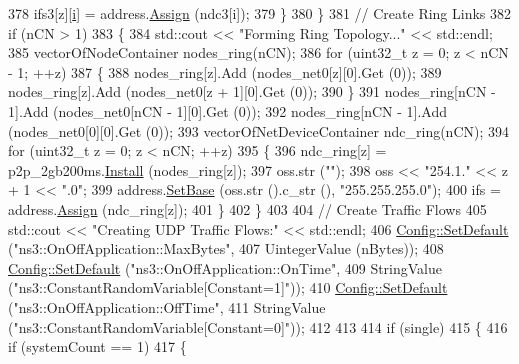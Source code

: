 \begin{DoxyCode}
378           ifs3[z][\hyperlink{bernuolliDistribution_8m_a6f6ccfcf58b31cb6412107d9d5281426}{i}] = address.\hyperlink{classns3_1_1Ipv4AddressHelper_af8e7f4a1a7e74c00014a1eac445a27af}{Assign} (ndc3[i]);
379         \}
380     \}
381   \textcolor{comment}{// Create Ring Links}
382   \textcolor{keywordflow}{if} (nCN > 1)
383     \{
384       std::cout << \textcolor{stringliteral}{"Forming Ring Topology..."} << std::endl;
385       vectorOfNodeContainer nodes\_ring(nCN);
386       \textcolor{keywordflow}{for} (uint32\_t z = 0; z < nCN - 1; ++z)
387         \{
388           nodes\_ring[z].Add (nodes\_net0[z][0].Get (0));
389           nodes\_ring[z].Add (nodes\_net0[z + 1][0].Get (0));
390         \}
391       nodes\_ring[nCN - 1].Add (nodes\_net0[nCN - 1][0].Get (0));
392       nodes\_ring[nCN - 1].Add (nodes\_net0[0][0].Get (0));
393       vectorOfNetDeviceContainer ndc\_ring(nCN);
394       \textcolor{keywordflow}{for} (uint32\_t z = 0; z < nCN; ++z)
395         \{
396           ndc\_ring[z] = p2p\_2gb200ms.\hyperlink{classns3_1_1PointToPointHelper_ab9162fea3e88722666fed1106df1f9ec}{Install} (nodes\_ring[z]);
397           oss.str (\textcolor{stringliteral}{""});
398           oss << \textcolor{stringliteral}{"254.1."} << z + 1 << \textcolor{stringliteral}{".0"};
399           address.\hyperlink{classns3_1_1Ipv4AddressHelper_acf7b16dd25bac67e00f5e25f90a9a035}{SetBase} (oss.str ().c\_str (), \textcolor{stringliteral}{"255.255.255.0"});
400           ifs = address.\hyperlink{classns3_1_1Ipv4AddressHelper_af8e7f4a1a7e74c00014a1eac445a27af}{Assign} (ndc\_ring[z]);
401         \}
402     \}
403 
404   \textcolor{comment}{// Create Traffic Flows}
405   std::cout << \textcolor{stringliteral}{"Creating UDP Traffic Flows:"} << std::endl;
406   \hyperlink{group__config_ga2e7882df849d8ba4aaad31c934c40c06}{Config::SetDefault} (\textcolor{stringliteral}{"ns3::OnOffApplication::MaxBytes"},
407                       UintegerValue (nBytes));
408   \hyperlink{group__config_ga2e7882df849d8ba4aaad31c934c40c06}{Config::SetDefault} (\textcolor{stringliteral}{"ns3::OnOffApplication::OnTime"},
409                       StringValue (\textcolor{stringliteral}{"ns3::ConstantRandomVariable[Constant=1]"}));
410   \hyperlink{group__config_ga2e7882df849d8ba4aaad31c934c40c06}{Config::SetDefault} (\textcolor{stringliteral}{"ns3::OnOffApplication::OffTime"},
411                       StringValue (\textcolor{stringliteral}{"ns3::ConstantRandomVariable[Constant=0]"}));
412 
413 
414   \textcolor{keywordflow}{if} (single)
415     \{
416       \textcolor{keywordflow}{if} (systemCount == 1)
417         \{

\end{DoxyCode}
